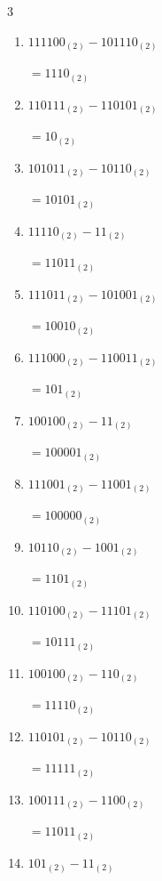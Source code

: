 \begin{multicols}{3}
\begin{enumerate}
  \item $111100_{(2)} - 101110_{(2)}$

        $=1110_{(2)}$

  \item $110111_{(2)} - 110101_{(2)}$

        $=10_{(2)}$

\columnbreak %

\resetques

  \item $101011_{(2)} - 10110_{(2)}$

        $=10101_{(2)}$

  \item $11110_{(2)} - 11_{(2)}$

        $=11011_{(2)}$

  \item $111011_{(2)} - 101001_{(2)}$

        $=10010_{(2)}$

  \item $111000_{(2)} - 110011_{(2)}$

        $=101_{(2)}$

  \item $100100_{(2)} - 11_{(2)}$

        $=100001_{(2)}$

  \item $111001_{(2)} - 11001_{(2)}$

        $=100000_{(2)}$

  \item $10110_{(2)} - 1001_{(2)}$

        $=1101_{(2)}$

  \item $110100_{(2)} - 11101_{(2)}$

        $=10111_{(2)}$

  \item $100100_{(2)} - 110_{(2)}$

        $=11110_{(2)}$

  \item $110101_{(2)} - 10110_{(2)}$

        $=11111_{(2)}$

\columnbreak %

  \item $100111_{(2)} - 1100_{(2)}$

        $=11011_{(2)}$

  \item $101_{(2)} - 11_{(2)}$


\end{enumerate}
\end{multicols}

